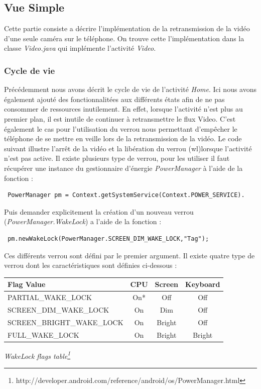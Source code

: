 \subsection{Vue Simple}
Cette partie consiste a décrire l'implémentation de la retransmission de la
vidéo d'une seule caméra sur le téléphone. On trouve cette l'implémentation dans la classe
\textit{Video.java} qui implémente l'activité \textit{Video}.
\subsubsection{Cycle de vie}
Précédemment nous avons décrit le cycle de vie de l'activité \textit{Home}.
Ici nous avons également ajouté des fonctionnalitées aux différents états afin de
ne pas consommer de ressources inutilement. En effet, lorsque l'activité n'est
plus au premier plan, il est inutile de continuer à retransmettre le flux
Video.\newline
C'est également le cas pour l'utilisation du verrou nous permettant d'empêcher
le téléphone de se mettre en veille lors de la retransmission de la vidéo. Le
code suivant illustre l'arrêt de la vidéo et la libération du verrou
(wl)lorsque l'activité n'est pas active.\newline
Il existe plusieurs type de verrou, pour les utiliser il faut récupérer une
instance du gestionnaire d'énergie \textit{PowerManager} à l'aide de la
fonction : 
\begin{lstlisting}
 PowerManager pm = Context.getSystemService(Context.POWER_SERVICE).
\end{lstlisting}
Puis demander explicitement la création d'un nouveau verrou
(\textit{PowerManager.WakeLock}) a l'aide de la fonction :
\begin{lstlisting}
 pm.newWakeLock(PowerManager.SCREEN_DIM_WAKE_LOCK,"Tag");
\end{lstlisting}
Ces différents verrou sont défini par le premier argument. Il existe quatre
type de verrou dont les caractéristiques sont définies ci-dessous :\newline
\begin{center}
\begin{tabular}{|l|c|c|c|}
\hline
Flag Value & CPU & Screen & Keyboard \\
\hline
PARTIAL\_WAKE\_LOCK & On* & Off & Off \\
SCREEN\_DIM\_WAKE\_LOCK & On & Dim & Off \\ 
SCREEN\_BRIGHT\_WAKE\_LOCK & On & Bright & Off \\
FULL\_WAKE\_LOCK & On & Bright & Bright \\
\hline
\end{tabular}
\newline
\textit{WakeLock flags table\footnote{\label{wakeLockTable}
http://developer.android.com/reference/android/os/PowerManager.html}}
\newline
\end{center}

